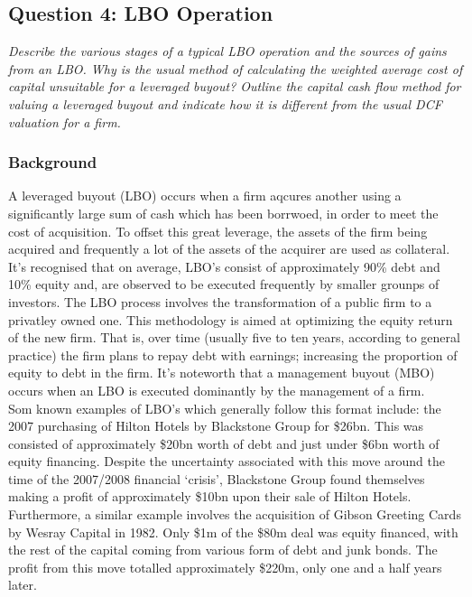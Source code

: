\documentclass[11pt, english]{article}
\begin{document}
	\newpage

	\subsection{Question 4: LBO Operation}

	\textit{Describe the various stages of a typical LBO operation and the sources of gains from an LBO. Why is the usual method of calculating the weighted average cost of capital unsuitable for a leveraged buyout? Outline the capital cash flow method for valuing a leveraged buyout and indicate how it is different from the usual DCF valuation for a firm.}

		\subsubsection*{Background}

	A leveraged buyout (LBO) occurs when a firm aqcures another using a significantly large sum of cash which has been borrwoed, in order to meet the cost of acquisition. To offset this great leverage, the assets of the firm being acquired and frequently a lot of the assets of the acquirer are used as collateral. It's recognised that on average, LBO's consist of approximately 90\% debt and 10\% equity and, are observed to be executed frequently by smaller grounps of investors. The LBO process involves the transformation of a public firm to a privatley owned one. This methodology is aimed at optimizing the equity return of the new firm. That is, over time (usually five to ten years, according to general practice) the firm plans to repay debt with earnings; increasing the proportion of equity to debt in the firm. It's noteworth that a management buyout (MBO) occurs when an LBO is executed dominantly by the management of a firm.\\

	Som known examples of LBO's which generally follow this format include: the 2007 purchasing of Hilton Hotels by Blackstone Group for \$26bn. This was consisted of approximately \$20bn worth of debt and just under \$6bn worth of equity financing. Despite the uncertainty associated with this move around the time of the 2007/2008 financial `crisis', Blackstone Group found themselves making a profit of approximately \$10bn upon their sale of Hilton Hotels. Furthermore, a similar example involves the acquisition of Gibson Greeting Cards by Wesray Capital in 1982. Only \$1m of the \$80m deal was equity financed, with the rest of the capital coming from various form of debt and junk bonds. The profit from this move totalled approximately \$220m, only one and a half years later.
\end{document}
